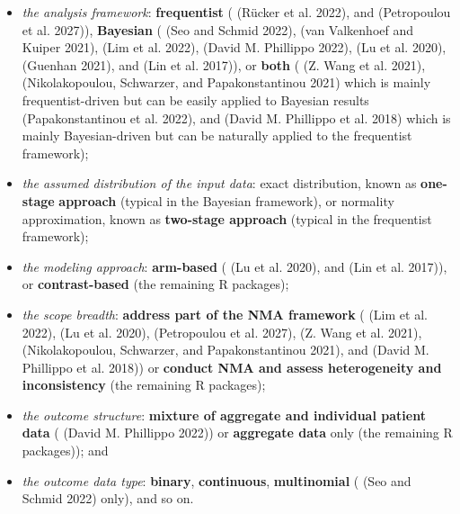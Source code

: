\begin{itemize}
\tightlist
\item
  \emph{the analysis framework}: \textbf{frequentist} ( (Rücker et al. 2022), and
   (Petropoulou et al. 2027)), \textbf{Bayesian} ( (Seo and Schmid 2022),
   (van Valkenhoef and Kuiper 2021),  (Lim et al. 2022),  (David M. Phillippo 2022),
   (Lu et al. 2020),  (Guenhan 2021), and 
  (Lin et al. 2017)), or \textbf{both} ( (Z. Wang et al. 2021), 
  (Nikolakopoulou, Schwarzer, and Papakonstantinou 2021) which is mainly frequentist-driven but can be easily applied to Bayesian
  results (Papakonstantinou et al. 2022), and  (David M. Phillippo et al. 2018) which is
  mainly Bayesian-driven but can be naturally applied to the frequentist framework);
\item
  \emph{the assumed distribution of the input data}: exact distribution, known as \textbf{one-stage}
  \textbf{approach} (typical in the Bayesian framework), or normality approximation, known as
  \textbf{two-stage approach} (typical in the frequentist framework);
\item
  \emph{the modeling approach}: \textbf{arm-based} ( (Lu et al. 2020), and
   (Lin et al. 2017)), or \textbf{contrast-based} (the remaining R packages);
\item
  \emph{the scope breadth}: \textbf{address part of the NMA framework} ( (Lim et al. 2022),
   (Lu et al. 2020),  (Petropoulou et al. 2027),
   (Z. Wang et al. 2021),  (Nikolakopoulou, Schwarzer, and Papakonstantinou 2021), and 
  (David M. Phillippo et al. 2018)) or \textbf{conduct NMA and assess heterogeneity and inconsistency}
  (the remaining R packages);
\item
  \emph{the outcome structure}: \textbf{mixture of aggregate and individual patient data}
  ( (David M. Phillippo 2022)) or \textbf{aggregate data} only (the remaining R
  packages)); and
\item
  \emph{the outcome data type}: \textbf{binary}, \textbf{continuous}, \textbf{multinomial} ( (Seo and Schmid 2022) only),
  and so on.
\end{itemize}

